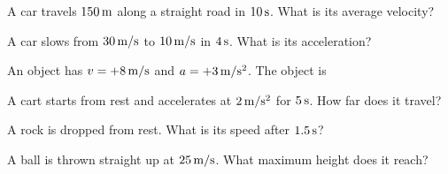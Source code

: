 \begin{exo}{}
A car travels $150\,\mathrm{m}$ along a straight road in $10\,\mathrm{s}$. What is its average velocity?
\choices{$15\ms$}{$1500\ms$}{$0.067\ms$}{$150\ms$}
\end{exo}
\begin{exo}{}
A car slows from $30\,\mathrm{m/s}$ to $10\ms$ in $4\,\mathrm{s}$. What is its acceleration?
\choices{$5\mss$}{$-5\mss$}{$-10\mss$}{$10\mss$}
\end{exo}
\begin{exo}{}
An object has $v=+8\,\mathrm{m/s}$ and $a=+3\,\mathrm{m/s^2}$. The object is
\end{exo}
\begin{exo}{}
A cart starts from rest and accelerates at $2\,\mathrm{m/s^2}$ for $5\,\mathrm{s}$. How far does it travel?
\choices{$10\m$}{$50\m$}{$5\m$}{$25\m$}
\end{exo}
\begin{exo}{}
A rock is dropped from rest. What is its speed after $1.5\,\mathrm{s}$?
\choices{$15\ms$}{$10\ms$}{$22.5\ms$}{$1.5\ms$}
\end{exo}
\begin{exo}{}
A ball is thrown straight up at $25\,\mathrm{m/s}$. What maximum height does it reach?
\choices{$62.5\m$}{$31.25\m$}{$25\m$}{$2.5\m$}
\end{exo}

